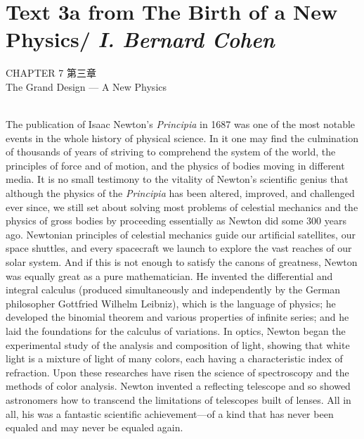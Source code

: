 \documentclass{article}
\begin{document}
\section{Text 3a from The Birth of a New Physics/ \textit{I. Bernard Cohen}}
\begin{center}
CHAPTER 7 第三章\\
The Grand Design — A New Physics\\
\end{center}
\\
The publication of Isaac Newton’s \textit{Principia} in 1687 was one of the most notable events in the whole history of physical science. In it one may find the culmination of thousands of years of striving to comprehend the system of the world, the principles of force and of motion, and the physics of bodies moving in different media. It is no small testimony to the vitality of Newton’s scientific genius that although the physics of the \textit{Principia} has been altered, improved, and challenged ever since, we still set about solving most problems of celestial mechanics and the physics of gross bodies by proceeding essentially as Newton did some 300 years ago. Newtonian principles of celestial mechanics guide our artificial satellites, our space shuttles, and every spacecraft we launch to explore the vast reaches of our solar system. And if this is not enough to satisfy the canons of greatness, Newton was equally great as a pure mathematician. He invented the differential and integral calculus (produced simultaneously and independently by the German philosopher Gottfried Wilhelm Leibniz), which is the language of physics; he developed the binomial theorem and various properties of infinite series; and he laid the foundations for the calculus of variations. In optics, Newton began the experimental study of the analysis and composition of light, showing that white light is a mixture of light of many colors, each having a characteristic index of refraction. Upon these researches have risen the science of spectroscopy and the methods of color analysis. Newton invented a reflecting telescope and so showed astronomers how to transcend the limitations of telescopes built of lenses. All in all, his was a fantastic scientific achievement—of a kind that has never been equaled and may never be equaled again.\\
\end{document}

